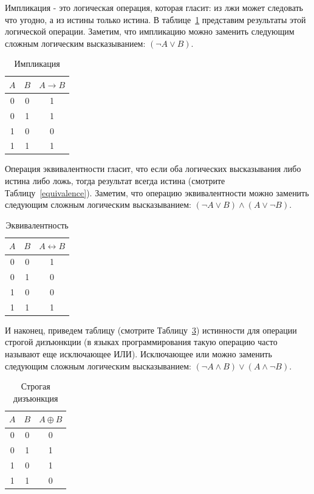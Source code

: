 Импликация - это логическая операция, которая гласит: из лжи может следовать что угодно, а
из истины только истина. В таблице~\ref{tab:implication} представим результаты этой логической 
операции. Заметим, что импликацию можно заменить следующим сложным логическим 
высказыванием: $(\lnot A \vee B)$.

\begin{table}[!h]
\centering
\begin{tabular}{|c|c|c|}
\hline
$A$ & $B$ & $A \rightarrow B$ \\\hline
0   &  0  &  1 \\\hline
0   &  1  &  1 \\\hline
1   &  0  &  0 \\\hline
1   &  1  &  1 \\\hline
\end{tabular}
\label{tab:implication}
\caption{Импликация}
\end{table}

Операция эквивалентности гласит, что если оба логических высказывания либо истина либо ложь, тогда
результат всегда истина (смотрите Таблицу~\ref{equivalence}). Заметим, что операцию эквивалентности
можно заменить следующим сложным логическим высказыванием: $(\lnot A \vee B) \wedge (A \vee \lnot B)$.

\begin{table}[!ht]
\centering
\begin{tabular}{|c|c|c|}
\hline
$A$ & $B$ & $A \leftrightarrow B$ \\\hline
0   &  0  &  1 \\\hline
0   &  1  &  0 \\\hline
1   &  0  &  0 \\\hline
1   &  1  &  1 \\\hline
\end{tabular}
\label{tab:equivalence}
\caption{Эквивалентность}
\end{table}

И наконец, приведем таблицу (смотрите Таблицу~\ref{tab:xor}) 
истинности для операции строгой дизъюнкции (в языках 
программирования такую операцию часто называют еще исключающее ИЛИ). 
Исключающее или можно заменить следующим сложным логическим
высказыванием: $(\lnot A \wedge B) \vee (A \wedge \lnot B)$. 

\begin{table}[!h]
\centering
\begin{tabular}{|c|c|c|}
\hline
$A$ & $B$ & $A \oplus B$ \\\hline
0   &  0  &  0 \\\hline
0   &  1  &  1 \\\hline
1   &  0  &  1 \\\hline
1   &  1  &  0 \\\hline
\end{tabular}
\label{tab:xor}
\caption{Строгая дизъюнкция}
\end{table}

